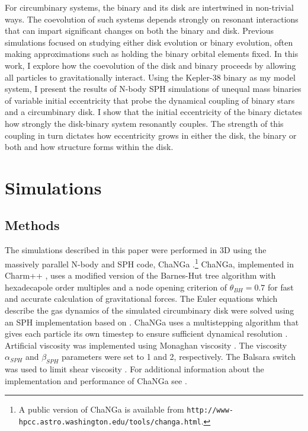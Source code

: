 For circumbinary systems, the binary and its disk are intertwined in
non-trivial ways.  The coevolution of such systems depends strongly on
resonant interactions that can impart significant changes on both the
binary and disk.  Previous simulations focused on studying either disk evolution or binary evolution, often making approximations
such as holding the binary orbital elements fixed.  In this work, I explore how the coevolution
of the disk and binary proceeds by allowing all particles to gravitationally interact.  
Using the Kepler-38 binary as my model system, I present the results of N-body
SPH simulations of unequal mass binaries of variable initial eccentricity 
that probe the dynamical coupling of binary stars and a circumbinary disk.  
I show that the initial eccentricity of the binary dictates how strongly the disk-binary system resonantly couples.
The strength of this coupling in turn dictates how eccentricity grows in either the disk, the binary or both and how structure 
forms within the disk.

\section{Simulations}

\subsection{Methods} \label{CBDisk:sec:methods_section}

The simulations described in this paper were performed in 3D using the massively parallel N-body 
and SPH code, ChaNGa
\citep{Menon2015}.\footnote{A public version of ChaNGa is available
  from {\tt http://www-hpcc.astro.washington.edu/tools/changa.html}.}
ChaNGa, implemented in Charm++ \citep{Kale1996}, uses a modified version of the Barnes-Hut tree algorithm with hexadecapole 
order multiples and a node opening criterion of $\theta_{BH} =
  0.7$ for fast and accurate calculation of gravitational forces.  The Euler equations which describe
the gas dynamics of the simulated circumbinary disk were solved using an SPH implementation based on
\citet{Wadsley2004}.  ChaNGa uses a multistepping algorithm that gives
each particle its own timestep to ensure sufficient dynamical
resolution \citep{Quinn1997}.  Artificial viscosity was implemented using
Monaghan viscosity \citep{Monaghan1983}.  The viscosity $\alpha_{SPH}$
  and $\beta_{SPH}$ parameters were set to 1 and 2, respectively.  The Balsara switch was used to limit shear viscosity \citep{Balsara1995}.  For additional information about the implementation and performance of ChaNGa see \citet{Jetley2008}.

